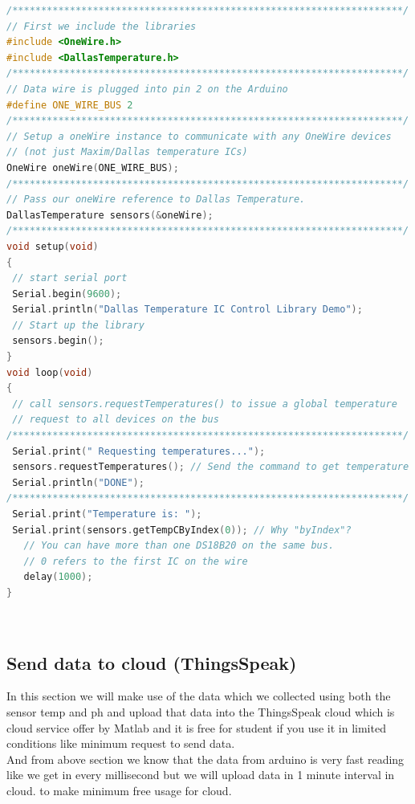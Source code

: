 \begin{lstlisting}[language=C++, caption={Arduino code for temp. sensor data}]
/********************************************************************/
// First we include the libraries
#include <OneWire.h> 
#include <DallasTemperature.h>
/********************************************************************/
// Data wire is plugged into pin 2 on the Arduino 
#define ONE_WIRE_BUS 2 
/********************************************************************/
// Setup a oneWire instance to communicate with any OneWire devices  
// (not just Maxim/Dallas temperature ICs) 
OneWire oneWire(ONE_WIRE_BUS); 
/********************************************************************/
// Pass our oneWire reference to Dallas Temperature. 
DallasTemperature sensors(&oneWire);
/********************************************************************/ 
void setup(void) 
{ 
 // start serial port 
 Serial.begin(9600); 
 Serial.println("Dallas Temperature IC Control Library Demo"); 
 // Start up the library 
 sensors.begin(); 
} 
void loop(void) 
{ 
 // call sensors.requestTemperatures() to issue a global temperature 
 // request to all devices on the bus 
/********************************************************************/
 Serial.print(" Requesting temperatures..."); 
 sensors.requestTemperatures(); // Send the command to get temperature readings 
 Serial.println("DONE"); 
/********************************************************************/
 Serial.print("Temperature is: "); 
 Serial.print(sensors.getTempCByIndex(0)); // Why "byIndex"?  
   // You can have more than one DS18B20 on the same bus.  
   // 0 refers to the first IC on the wire 
   delay(1000); 
} 
\end{lstlisting}\\

\subsection{Send data to cloud (ThingsSpeak)}

In this section we will make use of the data which we collected using both the sensor temp and ph and upload that data into the ThingsSpeak cloud which is cloud service offer by Matlab and it is free for student if you use it in limited conditions like minimum request to send data.\\

And from above section we know that the data from arduino is very fast reading like we get in every millisecond but we will upload data in 1 minute interval in cloud. to make minimum free usage for cloud.\\

